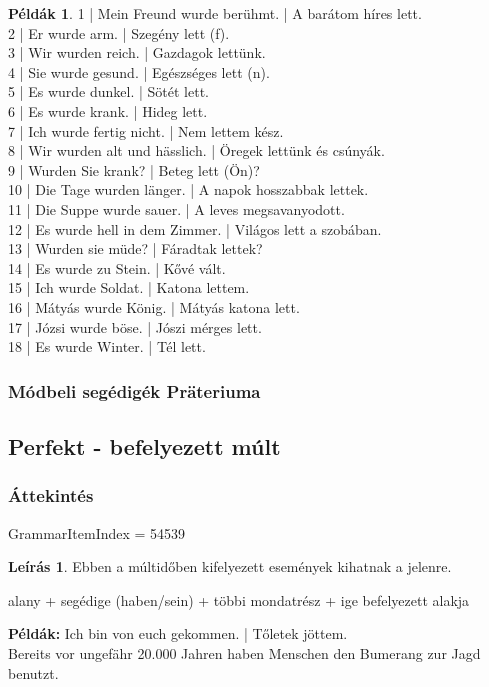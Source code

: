 \documentclass{article}
\theoremstyle{definition}
\newtheorem*{exmp}{Példák}
\newtheorem*{desc}{Leírás}
\begin{document}
\begin{exmp}
1 | Mein Freund wurde berühmt. | A barátom híres lett.\\
2 | Er wurde arm. | Szegény lett (f).\\
3 | Wir wurden reich. | Gazdagok lettünk.\\
4 | Sie wurde gesund. | Egészséges lett (n).\\
5 | Es wurde dunkel. | Sötét lett.\\
6 | Es wurde krank. | Hideg lett.\\
7 | Ich wurde fertig nicht. | Nem lettem kész.\\
8 | Wir wurden alt und hässlich. | Öregek lettünk és csúnyák.\\
9 | Wurden Sie krank? | Beteg lett (Ön)?\\
10 | Die Tage wurden länger. |  A napok hosszabbak lettek.\\
11 | Die Suppe wurde sauer. | A leves megsavanyodott.\\
12 | Es wurde hell in dem Zimmer. | Világos lett a szobában.\\
13 | Wurden sie müde? | Fáradtak lettek?\\
14 | Es wurde zu Stein. | Kővé vált.\\
15 | Ich wurde Soldat. | Katona lettem.\\
16 | Mátyás wurde König. | Mátyás katona lett.\\
17 | Józsi wurde böse. | Jószi mérges lett.\\
18 | Es wurde Winter. | Tél lett.\\
\end{exmp}

\subsubsection{Módbeli segédigék Präteriuma}

\subsection{Perfekt - befelyezett múlt}

\subsubsection{Áttekintés}

GrammarItemIndex = 54539

\begin{desc}
Ebben a múltidőben kifelyezett események kihatnak a jelenre.
\begin{center}
alany + segédige (haben/sein) + többi mondatrész + ige befelyezett alakja
\end{center}

\textbf{Példák:} Ich bin von euch gekommen. | Tőletek jöttem.\\
Bereits vor ungefähr 20.000 Jahren haben Menschen den Bumerang zur Jagd benutzt.
\end{desc}
\end{document}
